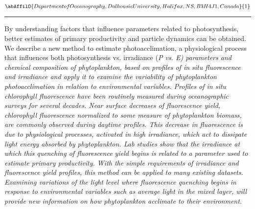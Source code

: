 \begin{minipage}{\linewidth}\begin{center}\begin{minipage}{\linewidth}
   \vspace{2 mm} \begin{center}
    \vspace{2 mm}\begin{center}
  
  $\abAffilO{Department of Oceanography, Dalhousie University, Halifax, NS, B3H 4J1, Canada}{1}$

  \end{center}
  \vspace{2 mm}
  \end{center}\end{minipage}\end{center}
  \begin{center}\rule{0.70\linewidth}{0.5 pt}\end{center}
  \begin{minipage}{\linewidth}
\noindent By understanding factors that influence parameters related to photosynthesis, better estimates of primary productivity and particle dynamics can be obtained. We describe a new method to estimate photoacclimation, a physiological process that influences both photosynthesis vs. irradiance (\sl P \rm vs. \sl E\rm) parameters and chemical composition of phytoplankton, based on profiles of \sl in situ \rm fluorescence and irradiance and apply it to examine the variability of phytoplankton photoacclimation in relation to environmental variables.
Profiles of \sl in situ \rm chlorophyll fluorescence have been routinely measured during oceanographic surveys for several decades. Near surface decreases of fluorescence yield, chlorophyll fluorescence normalized to some measure of phytoplankton biomass, are commonly observed during daytime profiles. This decrease in fluorescence is due to physiological processes, activated in high irradiance, which act to dissipate light energy absorbed by phytoplankton. Lab studies show that the irradiance at which this quenching of fluorescence yield begins is related to a parameter used to estimate primary productivity. With the simple requirements of irradiance and fluorescence yield profiles, this method can be applied to many existing datasets. Examining variations of the light level where fluorescence quenching begins in response to environmental variables such as average light in the mixed layer, will provide new information on how phytoplankton acclimate to their environment.
\end{minipage}\end{minipage}
